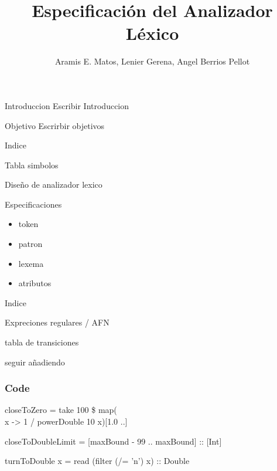 \documentclass[14pt, aspectratio=169]{beamer}
\title{Especificación del Analizador Léxico}
\author{Aramis E. Matos, Lenier Gerena, Angel Berrios Pellot}
\begin{document}
\maketitle
\begin{frame}{Introduccion}
    \small Escribir Introduccion 
\end{frame}

\begin{frame}{Objetivo}
    \small Escrirbir objetivos 
\end{frame}

\begin{frame}{Indice}
    \item Tabla simbolos
    \item Diseño de analizador lexico
    \item Especificaciones  
    \begin{itemize}
        \item token
        \item patron
        \item lexema
        \item atributos
    \end{itemize}
\end{frame}

\begin{frame}{Indice}
    \item Expreciones regulares / AFN
    \item tabla de transiciones 
    \item seguir añadiendo
\end{frame}

\begin{frame}[fragile=singleslide]
    \frametitle{Code}
    \small
closeToZero = take 100 \$ map(\\x -> 1 / powerDouble 10 x)[1.0 ..]

closeToDoubleLimit = [maxBound - 99 .. maxBound] :: [Int]

turnToDouble x = read (filter (/= 'n') x) :: Double

\end{frame}
\end{document}
